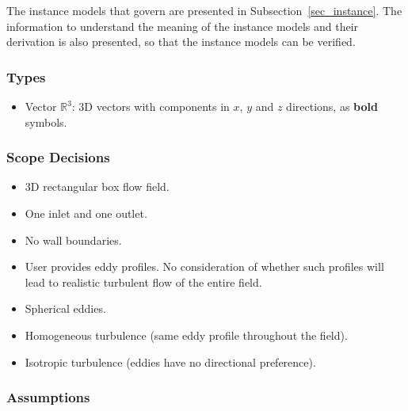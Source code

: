 \documentclass[12pt]{article}
\begin{document}
The instance models that govern \progname{} are presented in
Subsection~\ref{sec_instance}.  The information to understand the meaning of the
instance models and their derivation is also presented, so that the instance
models can be verified.

\subsubsection{Types}

\begin{itemize}
  \item Vector $\mathbb{R}^3$: 3D vectors with components in $x$, $y$ and $z$ directions, as \textbf{bold} symbols.
\end{itemize}


\subsubsection{Scope Decisions}
\begin{itemize}
  \item 3D rectangular box flow field.
  \item One inlet and one outlet.
  \item No wall boundaries.
  \item User provides eddy profiles. No consideration of whether such profiles will lead to realistic turbulent flow of the entire field.
  \item Spherical eddies.
  \item Homogeneous turbulence (same eddy profile throughout the field).
  \item Isotropic turbulence (eddies have no directional preference).
\end{itemize}



\subsubsection{Assumptions} \label{sec_assumpt}
\end{document}
